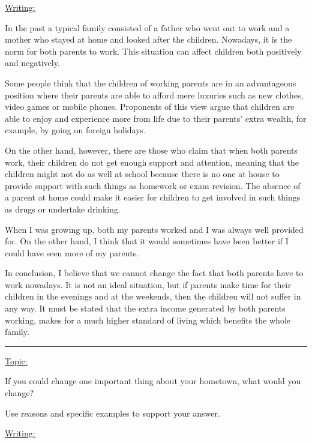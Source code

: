 \documentclass[UTF8]{ctexart}
\begin{document}
\noindent
\LARGE{\underline{Writing:}}

\normalsize{In the past a typical family consisted of a father who went out to work and a mother who stayed at home and looked after the children. Nowadays, it is the norm for both parents to work. This situation can affect children both positively and negatively.

Some people think that the children of working parents are in an advantageous position where their parents are able to afford mere luxuries such as new clothes, video games or mobile phones. Proponents of this view argue that children are able to enjoy and experience more from life due to their parents' extra wealth, for example, by going on foreign holidays.

On the other hand, however, there are those who claim that when both parents work, their children do not get enough support and attention, meaning that the children might not do as well at school because there is no one at house to provide support with such things as homework or exam revision. The absence of a parent at home could make it easier for children to get involved in such things as drugs or undertake drinking.

When I was growing up, both my parents worked and I was always well provided for. On the other hand, I think that it would sometimes have been better if I could have seen more of my parents.

In conclusion, I believe that we cannot change the fact that both parents have to work nowadays. It is not an ideal situation, but if parents make time for their children in the evenings and at the weekends, then the children will not suffer in any way. It must be stated that the extra income generated by both parents working, makes for a much higher standard of living which benefits the whole family.}

\noindent\rule[0.5ex]{\linewidth}{0.25pt}
\LARGE{\underline{Topic:}}

\normalsize{If you could change one important thing about your hometown, what would you change?

Use reasons and specific examples to support your answer.}

\noindent
\LARGE{\underline{Writing:}}
\end{document}
